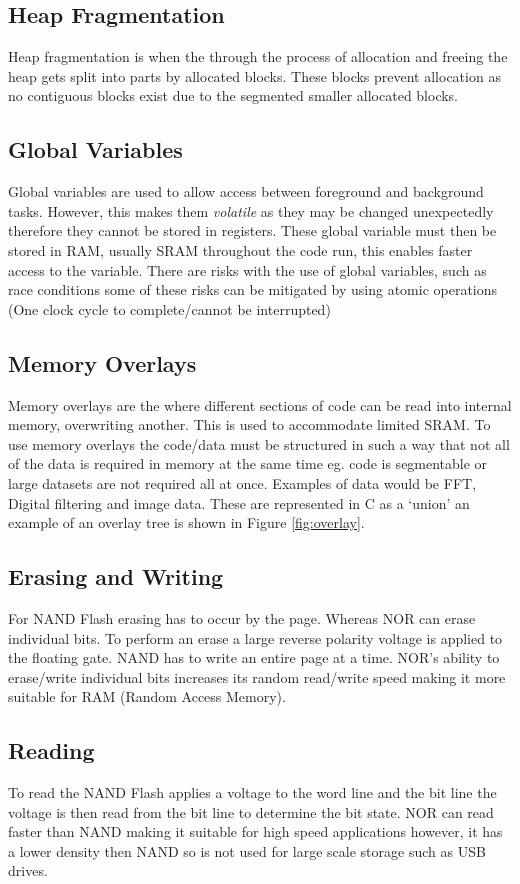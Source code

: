 \subsection{Heap Fragmentation}
Heap fragmentation is when the through the process of allocation and freeing the heap gets split
into parts by allocated blocks. These blocks prevent allocation as no contiguous blocks exist due to
the segmented smaller allocated blocks.

\subsection{Global Variables}
Global variables are used to allow access between foreground and background tasks. However, this
makes them \textit{volatile} as they may be changed unexpectedly therefore they cannot be stored in
registers. These global variable must then be stored in RAM, usually SRAM throughout the code run,
this enables faster access to the variable. There are risks with the use of global variables, such
as race conditions some of these risks can be mitigated by using atomic operations (One clock cycle
to complete/cannot be interrupted)

\subsection{Memory Overlays}
Memory overlays are the where different sections of code can be read into internal memory,
overwriting another. This is used to accommodate limited SRAM. To use memory overlays the code/data
must be structured in such a way that not all of the data is required in memory at the same time eg.
code is segmentable or large datasets are not required all at once. Examples of data would be FFT,
Digital filtering and image data. These are represented in C as a `union' an example of an overlay
tree is shown in Figure \ref{fig:overlay}.



\subsection{Erasing and Writing}
For NAND Flash erasing has to occur by the page. Whereas NOR can erase individual bits. To perform
an erase a large reverse polarity voltage is applied to the floating gate. NAND has to write 
an entire page at a time. NOR's ability to erase/write individual bits increases its random 
read/write speed making it more suitable for RAM (Random Access Memory).

\subsection{Reading}
To read the NAND Flash applies a voltage to the word line and the bit line the voltage is then read
from the bit line to determine the bit state. NOR can read faster than NAND making it suitable for
high speed applications however, it has a lower density then NAND so is not used for large scale
storage such as USB drives.
